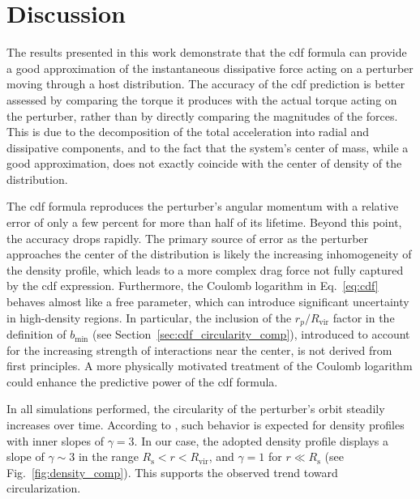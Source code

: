 \documentclass[twocolumn, a4paper]{article}
\begin{document}
\section{Discussion}

The results presented in this work demonstrate that the \acrshort{cdf} formula can provide a good approximation of the instantaneous dissipative force acting on a perturber moving through a host distribution. The accuracy of the \acrshort{cdf} prediction is better assessed by comparing the torque it produces with the actual torque acting on the perturber, rather than by directly comparing the magnitudes of the forces. This is due to the decomposition of the total acceleration into radial and dissipative components, and to the fact that the system’s center of mass, while a good approximation, does not exactly coincide with the center of density of the distribution.

The \acrshort{cdf} formula reproduces the perturber’s angular momentum with a relative error of only a few percent for more than half of its lifetime. Beyond this point, the accuracy drops rapidly. The primary source of error as the perturber approaches the center of the distribution is likely the increasing inhomogeneity of the density profile, which leads to a more complex drag force not fully captured by the \acrshort{cdf} expression. Furthermore, the Coulomb logarithm in Eq.~\ref{eq:cdf} behaves almost like a free parameter, which can introduce significant uncertainty in high-density regions. In particular, the inclusion of the \(r_p / R_\text{vir}\) factor in the definition of \(b_\text{min}\) (see Section~\ref{sec:cdf_circularity_comp}), introduced to account for the increasing strength of interactions near the center, is not derived from first principles. A more physically motivated treatment of the Coulomb logarithm could enhance the predictive power of the \acrshort{cdf} formula.

In all simulations performed, the circularity of the perturber’s orbit steadily increases over time. According to \citeauthor{Vasiliev2022}, such behavior is expected for density profiles with inner slopes of \(\gamma = 3\). In our case, the adopted density profile displays a slope of \(\gamma \sim 3\) in the range \(R_\text{s} < r < R_\text{vir}\), and \(\gamma = 1\) for \(r \ll R_\text{s}\) (see Fig.~\ref{fig:density_comp}). This supports the observed trend toward circularization.
\end{document}
